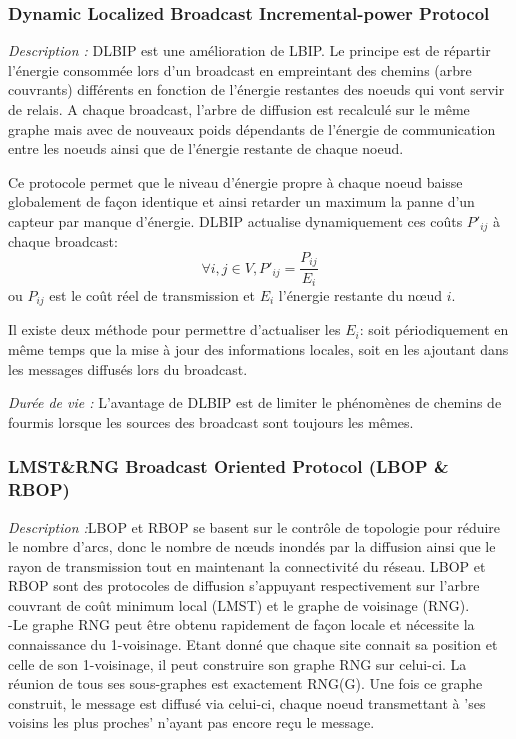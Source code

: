 \subsubsection{Dynamic Localized Broadcast Incremental-power Protocol \cite{Champ2009DLBIP}}

\emph{Description :} DLBIP est une amélioration de LBIP. Le principe est de répartir l'énergie consommée lors 
d'un broadcast en empreintant des chemins (arbre couvrants) différents en fonction de l'énergie restantes des 
noeuds qui vont servir de relais. A chaque broadcast, l'arbre de diffusion est recalculé sur le même graphe mais
avec de nouveaux poids dépendants de l'énergie de communication entre les noeuds ainsi que de l'énergie restante
de chaque noeud.

Ce protocole permet que le niveau d'énergie propre à chaque noeud baisse globalement de façon identique et ainsi 
retarder un maximum la panne d'un capteur par manque d'énergie.
DLBIP actualise dynamiquement ces coûts $P'_{ij}$ à chaque broadcast:
$$ \forall i,j \in V, P'_{ij}=\frac{P_{ij}}{E_i}$$
ou $P_{ij}$ est le coût réel de transmission et $E_i$ l'énergie restante du nœud $i$.

Il existe deux méthode pour permettre d'actualiser les $E_i$: soit périodiquement en même temps que la mise à jour des informations locales, soit en les ajoutant dans les messages diffusés lors du broadcast.




\emph{Durée de vie :} L'avantage de DLBIP est de limiter le phénomènes de chemins de fourmis lorsque les sources des broadcast sont toujours les mêmes.

\subsubsection{LMST\&RNG Broadcast Oriented Protocol (LBOP \& RBOP) \cite{Cartigny2005}}



\emph{Description :}LBOP et RBOP se basent sur le contrôle de topologie pour réduire le nombre d'arcs, donc 
le nombre de nœuds inondés par la diffusion ainsi que le rayon de transmission tout en maintenant la connectivité
du réseau. LBOP et RBOP sont des protocoles de diffusion s'appuyant respectivement sur l'arbre couvrant de 
coût minimum local (LMST) et le graphe de voisinage (RNG).\\

-Le graphe RNG peut être obtenu rapidement de façon locale et nécessite la connaissance du 1-voisinage. Etant donné
que chaque site connait sa position et celle de son 1-voisinage, il peut construire son graphe RNG sur celui-ci. La
réunion de tous ses sous-graphes est exactement RNG(G). Une fois ce graphe construit, le message est diffusé via 
celui-ci, chaque noeud  transmettant à 'ses voisins les plus proches' n'ayant pas encore reçu le message.\\


